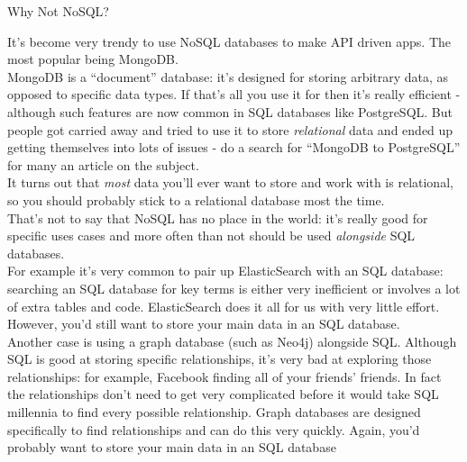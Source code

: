 \begin{infobox}{Why Not NoSQL?}

    It's become very trendy to use NoSQL databases to make API driven apps\footnotemark. The most popular being MongoDB.
    \\

    MongoDB is a ``document'' database: it's designed for storing arbitrary data, as opposed to specific data types. If that's all you use it for then it's really efficient - although such features are now common in SQL databases like PostgreSQL. But people got carried away and tried to use it to store \textit{relational} data and ended up getting themselves into lots of issues - do a search for ``MongoDB to PostgreSQL'' for many an article on the subject.
    \\

    It turns out that \textit{most} data you'll ever want to store and work with is relational, so you should probably stick to a relational database most the time.
    \\

    That's not to say that NoSQL has no place in the world: it's really good for specific uses cases and more often than not should be used \textit{alongside} SQL databases.
    \\

    For example it's very common to pair up ElasticSearch with an SQL database: searching an SQL database for key terms is either very inefficient or involves a lot of extra tables and code. ElasticSearch does it all for us with very little effort. However, you'd still want to store your main data in an SQL database.
    \\

    Another case is using a graph database (such as Neo4j) alongside SQL. Although SQL is good at storing specific relationships, it's very bad at exploring those relationships: for example, Facebook finding all of your friends' friends. In fact the relationships don't need to get very complicated before it would take SQL millennia to find every possible relationship. Graph databases are designed specifically to find relationships and can do this very quickly. Again, you'd probably want to store your main data in an SQL database
\end{infobox}



